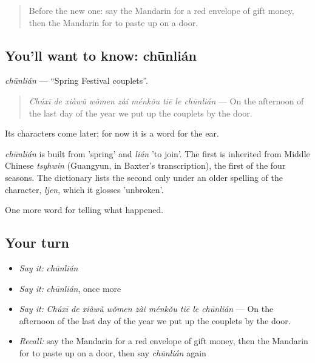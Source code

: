 \label{lesson:ZH-C334-chunlian}



\begin{quote}
Before the new one: say the Mandarin for a red envelope of gift money, then the Mandarin for to paste up on a door.
\end{quote}

\subsection*{You'll want to know: chūnlián}
\emph{chūnlián} — \textquotedblleft{}Spring Festival couplets\textquotedblright{}.

\begin{quote}
\emph{Chúxī de xiàwǔ wǒmen zài ménkǒu tiē le chūnlián} — On the afternoon of the last day of the year we put up the couplets by the door.
\end{quote}

Its characters come later; for now it is a word for the ear.

\begin{cousinweb}
\emph{chūnlián} is built from  'spring' and \emph{lián} 'to join'. The first is inherited from Middle Chinese \emph{tsyhwin} (Guangyun, in Baxter's transcription), the first of the four seasons. The dictionary lists the second only under an older spelling of the character, \emph{ljen}, which it glosses 'unbroken'.
\end{cousinweb}

\begin{grammarlens}[title={What you've built}]
One more word for telling what happened.
\end{grammarlens}

\subsection*{Your turn}
\begin{itemize}
\raggedright
  \item \emph{Say it:} \emph{chūnlián}
  \item \emph{Say it:} \emph{chūnlián}, once more
  \item \emph{Say it:} \emph{Chúxī de xiàwǔ wǒmen zài ménkǒu tiē le chūnlián} — On the afternoon of the last day of the year we put up the couplets by the door.
  \item \emph{Recall:} say the Mandarin for a red envelope of gift money, then the Mandarin for to paste up on a door, then say \emph{chūnlián} again
\end{itemize}

